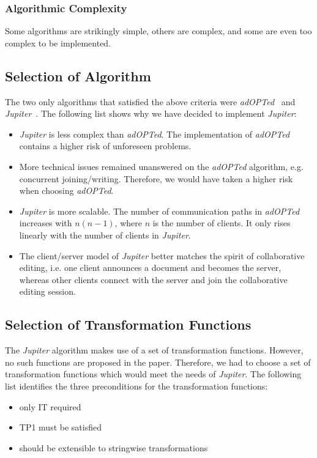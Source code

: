 \subsubsection{Algorithmic Complexity} 
Some algorithms are strikingly simple,
others are complex, and some are even too complex to be implemented.


\subsection{Selection of Algorithm}
The two only algorithms that satisfied the above criteria were 
\emph{adOPTed}~\cite{ressel96} and \emph{Jupiter}~\cite{jupiter95}. The 
following list shows why we have decided to implement \emph{Jupiter}:

\begin{itemize}
 \item \emph{Jupiter} is less complex than \emph{adOPTed}. The implementation of  \emph{adOPTed} contains a higher risk of unforeseen problems. 
 \item More technical issues remained unanswered on the \emph{adOPTed} 
algorithm, e.g. concurrent joining/writing. Therefore, we would have taken a 
higher risk when choosing \emph{adOPTed}.
 \item \emph{Jupiter} is more scalable. The number of 
communication paths in \emph{adOPTed} increases with $n(n-1)$, where $n$ is the 
number of clients. It only rises linearly with the number of clients in 
\emph{Jupiter}.
 \item The client/server model of \emph{Jupiter} better matches the spirit of collaborative editing, i.e. one client announces a document and becomes the server, whereas other clients connect with the server and join the collaborative editing session.
\end{itemize}

\subsection{Selection of Transformation Functions}
The \emph{Jupiter} algorithm makes use of a set of transformation functions.
However, no such functions are proposed in the paper. Therefore, we had to 
choose a set of transformation functions which would meet the needs of 
\emph{Jupiter}. The following list identifies the three preconditions for the 
transformation functions:

\begin{itemize}
 \item only IT required
 \item TP1 must be satisfied
 \item should be extensible to stringwise transformations
\end{itemize}

